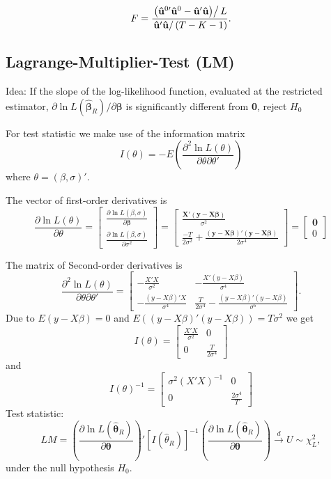 \documentclass{article}
\begin{document}
\[F=\frac{\left. \left( \mathbf{\hat{u}}^{0\prime }\mathbf{\hat{u}}^{0}-%
\mathbf{\hat{u}}'\mathbf{\hat{u}}\right) \right/ L}{\left. \mathbf{%
\hat{u}}'\mathbf{\hat{u}}\right/ \left( T-K-1\right) }. \]

\subsection*{Lagrange-Multiplier-Test (LM)}

Idea: If the slope of the log-likelihood function, evaluated at the restricted estimator, $\partial \ln L(\mathbf{\hat{\beta}}_{R})/\partial \mathbf{\beta }$ 
is significantly
different from \textbf{0}, reject $H_{0}$

For test statistic we make use of the information matrix
\[ I(\theta)=-E\left(\frac{\partial^2\ln L(\theta)}{\partial\theta\partial\theta'}\right)\]
where $\theta=(\beta,\sigma)'$. 

The vector of first-order derivatives is
\[ \frac{\partial\ln L(\theta)}{\partial\theta}=\left[ 
\begin{array}{c}
\frac{\partial \ln L(\beta,\sigma)}{\partial \mathbf{\beta }} \\[2ex] 
\frac{\partial \ln L(\beta,\sigma)}{\partial \sigma ^{2}}%
\end{array}%
\right] =\left[ 
\begin{array}{c}
\frac{\mathbf{X}'(\mathbf{y}-\mathbf{X}\mathbf{\beta })}{\sigma^2} \\[2ex] 
\frac{-T}{2\sigma^2}+\frac{(\mathbf{y}-\mathbf{X\beta })'(\mathbf{y}-\mathbf{X\beta })}{2\sigma^4}\end{array}
\right] =\left[ 
\begin{array}{c}
\mathbf{0} \\ 0
\end{array}
\right] \]

The matrix of Second-order derivatives is
\[ \frac{\partial^2\ln L(\theta)}{\partial\theta\partial\theta'} 
=\left[\begin{array}{cc}
-\frac{X'X}{\sigma^2} & -\frac{X'(y-X\beta)}{\sigma^4}\\[2ex]
-\frac{(y-X\beta)'X}{\sigma^4} & \frac{T}{2\sigma^4}-\frac{(y-X\beta)'(y-X\beta)}{\sigma^6}
\end{array}\right]. \]
Due to $E(y-X\beta)=0$ and $E((y-X\beta)'(y-X\beta))=T\sigma^2$ we get
\[ I(\theta)=\left[\begin{array}{cc}
\frac{X'X}{\sigma^2} & 0 \\[2ex]
0 & \frac{T}{2\sigma^4}
\end{array}\right] \]
and
\[ I(\theta)^{-1}=\left[\begin{array}{cc}
\sigma^2(X'X)^{-1} & 0 \\[2ex]
0 & \frac{2\sigma^4}{T}
\end{array}\right] \]
Test statistic:
\[ LM=
\left( \frac{\partial \ln L(\mathbf{\hat{\theta}}_{R})}{\partial \mathbf{\theta }}\right)'
\left[ I(\hat\theta_R) \right] ^{-1}
\left( \frac{\partial \ln L(\mathbf{\hat{\theta}}_{R})}{\partial \mathbf{\theta }}\right) 
\overset{d}{\rightarrow }U\sim \chi_L^2, \]
under the null hypothesis $H_0$.
\end{document}
